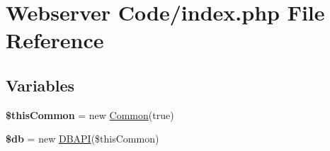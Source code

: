 \hypertarget{index_8php}{}\section{Webserver Code/index.php File Reference}
\label{index_8php}
\subsection*{Variables}
\begin{DoxyCompactItemize}
\item 
{\bfseries \$this\+Common} = new \hyperlink{class_common}{Common}(true)\hypertarget{index_8php_a2dc37683cec5a169d791007363950944}{}\label{index_8php_a2dc37683cec5a169d791007363950944}

\item 
{\bfseries \$db} = new \hyperlink{class_d_b_a_p_i}{D\+B\+A\+PI}(\$this\+Common)\hypertarget{index_8php_a1fa3127fc82f96b1436d871ef02be319}{}\label{index_8php_a1fa3127fc82f96b1436d871ef02be319}

\end{DoxyCompactItemize}
